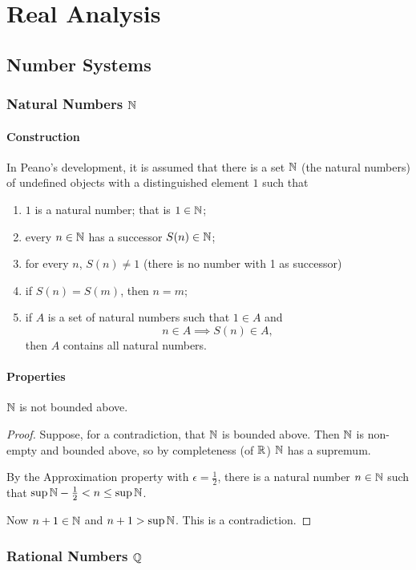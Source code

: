 \part{Real Analysis}
\chapter{Number Systems}
\section{Natural Numbers $\mathbb N$}
\subsection{Construction}
In Peano's development, it is assumed that there is a set $\mathbb N$ (the natural numbers) of undefined objects with a distinguished element $1$ such that
\begin{enumerate}[label=(\roman*)]
\item $1$ is a natural number; that is $1\in\mathbb N$;
\item every $n\in\mathbb N$ has a successor $S(n)\in\mathbb N$;
\item for every $n$, $S(n)\neq1$ (there is no number with 1 as successor)
\item if $S(n)=S(m)$, then $n=m$;
\item if $A$ is a set of natural numbers such that $1\in A$ and
\[n\in A\implies S(n)\in A,\]
then $A$ contains all natural numbers.
\end{enumerate}

\subsection{Properties}
\begin{theorem}
$\mathbb N$ is not bounded above.
\end{theorem}

\begin{proof}
Suppose, for a contradiction, that $\mathbb N$ is bounded above. Then $\mathbb N$ is non-empty and bounded above, so by completeness (of $\mathbb R$) $\mathbb N$ has a supremum.

By the Approximation property with $\epsilon=\frac{1}{2}$, there is a natural number $n\in\mathbb N$ such that $\sup\mathbb N-\frac{1}{2}<n\le\sup\mathbb N$.

Now $n+1\in\mathbb N$ and $n+1>\sup\mathbb N$. This is a contradiction.
\end{proof}
\pagebreak

\section{Rational Numbers $\mathbb Q$}
